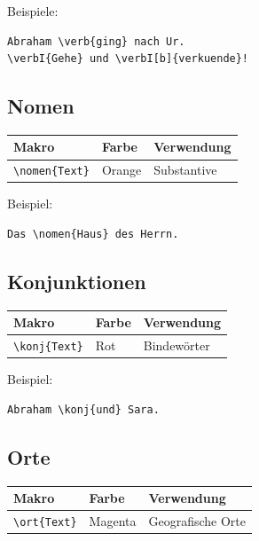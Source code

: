 \documentclass[12pt,a4paper]{scrartcl}
\begin{document}
Beispiele:
\begin{lstlisting}
Abraham \verb{ging} nach Ur.
\verbI{Gehe} und \verbI[b]{verkuende}!
\end{lstlisting}

\subsection{Nomen}

\begin{tabular}{lll}
\toprule
\textbf{Makro} & \textbf{Farbe} & \textbf{Verwendung} \\
\midrule
\lstinline|\nomen{Text}| & Orange & Substantive \\
\bottomrule
\end{tabular}

Beispiel:
\begin{lstlisting}
Das \nomen{Haus} des Herrn.
\end{lstlisting}

\subsection{Konjunktionen}

\begin{tabular}{lll}
\toprule
\textbf{Makro} & \textbf{Farbe} & \textbf{Verwendung} \\
\midrule
\lstinline|\konj{Text}| & Rot & Bindew{\"o}rter \\
\bottomrule
\end{tabular}

Beispiel:
\begin{lstlisting}
Abraham \konj{und} Sara.
\end{lstlisting}

\subsection{Orte}

\begin{tabular}{lll}
\toprule
\textbf{Makro} & \textbf{Farbe} & \textbf{Verwendung} \\
\midrule
\lstinline|\ort{Text}| & Magenta & Geografische Orte \\
\bottomrule
\end{tabular}
\end{document}
